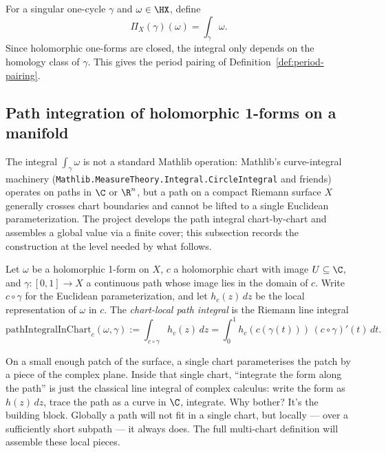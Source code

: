 For a singular one-cycle \(\gamma\) and \(\omega\in\HX\), define
\[
  \Pi_X(\gamma)(\omega)=\int_{\gamma}\omega.
\]
Since holomorphic one-forms are closed, the integral only depends on the
homology class of \(\gamma\). This gives the period pairing of
Definition~\ref{def:period-pairing}.

\subsection{Path integration of holomorphic 1-forms on a manifold}

The integral \(\int_\gamma\omega\) is not a standard Mathlib operation:
Mathlib's curve-integral machinery
(\texttt{Mathlib.MeasureTheory.Integral.CircleIntegral} and friends)
operates on paths in \(\C\) or \(\R^n\), but a path on a compact
Riemann surface \(X\) generally crosses chart boundaries and cannot
be lifted to a single Euclidean parameterization. The project
develops the path integral chart-by-chart and assembles a global
value via a finite cover; this subsection records the construction
at the level needed by what follows.

\begin{definition}
\label{def:path-integral-in-chart}
Let \(\omega\) be a holomorphic 1-form on \(X\), \(c\) a holomorphic
chart with image \(U\subseteq\C\), and \(\gamma:[0,1]\to X\) a
continuous path whose image lies in the domain of \(c\). Write
\(c\circ\gamma\) for the Euclidean parameterization, and let
\(h_c(z)\,dz\) be the local representation of \(\omega\) in \(c\).
The \emph{chart-local path integral} is the Riemann line integral
\[
  \mathrm{pathIntegralInChart}_c(\omega,\gamma)
    := \int_{c\circ\gamma} h_c(z)\,dz
    = \int_0^1 h_c(c(\gamma(t)))\,(c\circ\gamma)'(t)\,dt.
\]
\leanok
\end{definition}

\begin{layman}
On a small enough patch of the surface, a single chart parameterises
the patch by a piece of the complex plane. Inside that single
chart, ``integrate the form along the path'' is just the classical
line integral of complex calculus: write the form as \(h(z)\,dz\),
trace the path as a curve in \(\C\), integrate. Why bother? It's
the building block. Globally a path will not fit in a single chart,
but locally --- over a sufficiently short subpath --- it always does.
The full multi-chart definition will assemble these local pieces.
\end{layman}

